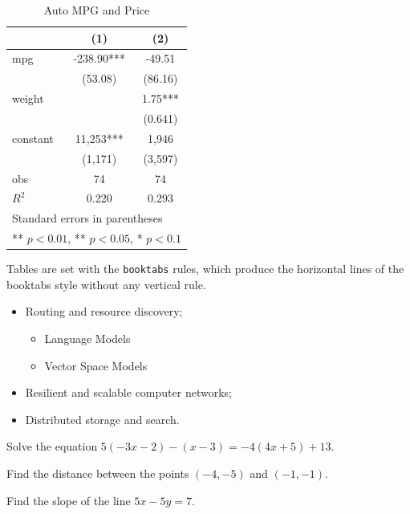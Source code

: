 \documentclass[11pt]{boyogalaelegantbook}
\begin{document}
\begin{table}[htbp]
  \small
  \centering
  \caption{Auto MPG and Price \label{tab:reg}}
    \begin{tabular}{lcc}
    \toprule
                    &       (1)         &        (2)      \\
    \midrule
    mpg             &    -238.90***     &      -49.51     \\
                    &     (53.08)       &      (86.16)    \\
    weight          &                   &      1.75***    \\
                    &                   &      (0.641)    \\
    constant        &     11,253***     &       1,946     \\
                    &     (1,171)       &      (3,597)   \\
    obs             &        74         &         74     \\
    $R^2$           &      0.220        &       0.293    \\
    \bottomrule
    \multicolumn{3}{l}{\scriptsize Standard errors in parentheses} \\
    \multicolumn{3}{l}{\scriptsize *** $p < 0.01$, ** $p<0.05$, * $p<0.1$} \\
    \end{tabular}%
\end{table}%

Tables are set with the \lstinline{booktabs} rules, which produce the horizontal lines of the booktabs style without any vertical rule.

\begin{itemize}
  \item Routing and resource discovery;
       \begin{itemize} 
             \item Language Models
            \item Vector Space Models
         \end{itemize}
  \item Resilient and scalable computer networks;
  \item Distributed storage and search.
\end{itemize}

\begin{problemset}
  \item Solve the equation $5(- 3x - 2) - (x - 3) = -4(4x + 5) + 13$.
  \item Find the distance between the points $(-4 , -5)$ and $(-1 , -1)$.
  \item Find the slope of the line $5x - 5y = 7$.
\end{problemset}
\end{document}
